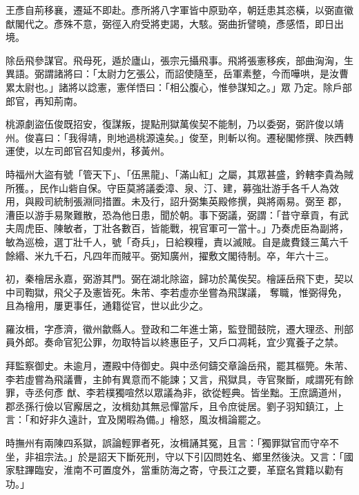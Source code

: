 \begin{pinyinscope}
 王彥自荊移襄，遷延不即赴。彥所將八字軍皆中原勁卒，朝廷患其恣橫，以弼直徽猷閣代之。彥殊不意，弼徑入府受將吏謁，大駭。弼曲折譬曉，彥感悟，即日出境。



 除岳飛參謀官。飛母死，遁於廬山，張宗元攝飛事。飛將張憲移疾，部曲洶洶，生異語。弼謂諸將曰：「太尉力乞張公，而詔使隨至，岳軍素整，今而嘩哄，是汝曹累太尉也。」諸將以諗憲，憲佯悟曰：「相公腹心，惟參謀知之。」眾
 乃定。除戶部郎官，再知荊南。



 桃源劇盜伍俊既招安，復謀叛，提點刑獄萬俟契不能制，乃以委弼，弼許俊以靖州。俊喜曰：「我得靖，則地過桃源遠矣。」俊至，則斬以徇。遷秘閣修撰、陜西轉運使，以左司郎官召知虔州，移黃州。



 時福州大盜有號「管天下」、「伍黑龍」、「滿山紅」之屬，其眾甚盛，鈐轄李貴為賊所獲。，民作山砦自保。守臣莫將議委漳、泉、汀、建，募強壯游手各千人為效用，與殿司統制張淵同措置。未及行，詔升弼集英殿修撰，與將兩易。弼至
 郡，漕臣以游手易聚難散，恐為他日患，聞於朝。事下弼議，弼謂：「昔守章貢，有武夫周虎臣、陳敏者，丁壯各數百，皆能戰，視官軍可一當十。」乃奏虎臣為副將，敏為巡檢，選丁壯千人，號「奇兵」，日給糗糧，責以滅賊。自是歲費錢三萬六千餘緡、米九千石，凡四年而賊平。弼知廣州，擢敷文閣待制。卒，年六十三。



 初，秦檜居永嘉，弼游其門。弼在湖北除盜，歸功於萬俟契。檜誣岳飛下吏，契以中司鞫獄，飛父子及憲皆死。朱芾、李若虛亦坐嘗為飛謀議，
 奪職，惟弼得免，且為檜用，屢更事任，通籍從官，世以此少之。



 羅汝楫，字彥濟，徽州歙縣人。登政和二年進士第，監登聞鼓院，遷大理丞、刑部員外郎。奏命官犯公罪，勿取特旨以終惠臣子，又戶口凋耗，宜少寬養子之禁。



 拜監察御史。未逾月，遷殿中侍御史。與中丞何鑄交章論岳飛，罷其樞筦。朱芾、李若虛嘗為飛議曹，主帥有異意而不能諫；又言，飛獄具，寺官聚斷，咸謂死有餘罪，寺丞何彥
 猷、李若樸獨喧然以眾議為非，欲從輕典。皆坐黜。王庶謫道州，郡丞孫行儉以官廨居之，汝楫劾其無忌憚當斥，且令庶徙居。劉子羽知鎮江，上言：「和好非久遠計，宜及閑暇為備。」檜怒，風汝楫論罷之。



 時撫州有兩陳四系獄，誤論輕罪者死，汝楫誦其冤，且言：「獨罪獄官而守卒不坐，非祖宗法。」於是詔天下斷死刑，守以下引囚問姓名、鄉里然後決。又言：「國家駐蹕臨安，淮南不可置度外，當重防海之寄，守長江之要，革竄名賞籍以勸有功。」




\end{pinyinscope}
